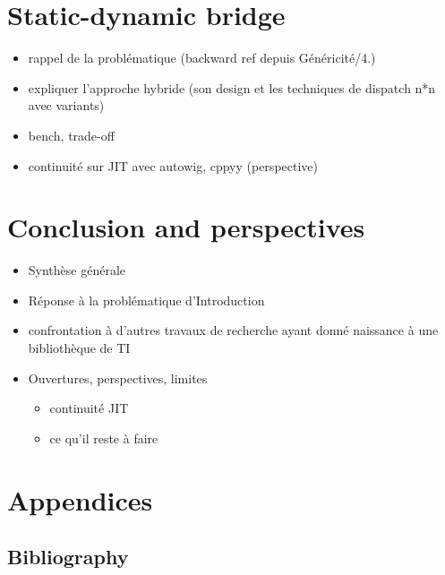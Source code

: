 \documentclass{book}
\begin{document}
\cleardoublepage


\chapter{Static-dynamic bridge}

\begin{itemize}
  \item rappel de la problématique (backward ref depuis Généricité/4.)
  \item expliquer l'approche hybride (son design et les techniques de dispatch n*n avec variants)
  \item bench, trade-off
  \item continuité sur JIT avec autowig, cppyy (perspective)
\end{itemize}

\cleardoublepage


\chapter{Conclusion and perspectives}

\begin{itemize}
  \item Synthèse générale
  \item Réponse à la problématique d'Introduction
  \item confrontation à d'autres travaux de recherche ayant donné naissance à une bibliothèque de TI
  \item Ouvertures, perspectives, limites
  \begin{itemize}
    \item continuité JIT
    \item ce qu'il reste à faire
  \end{itemize}
\end{itemize}

\cleardoublepage


\chapter{Appendices}

\appendix

\section{Bibliography}


\end{document}
